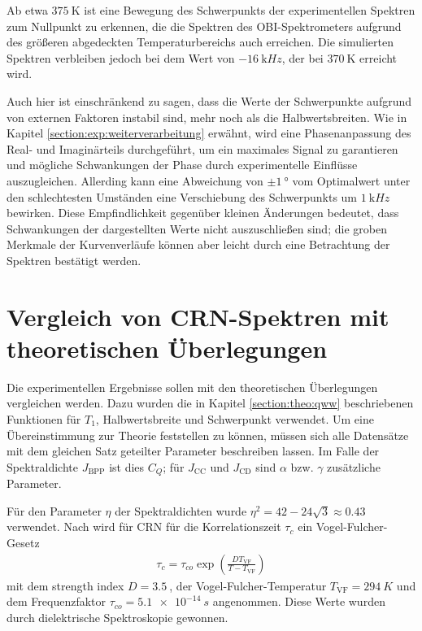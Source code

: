 Ab etwa $\SI{375}{\kelvin}$ ist eine Bewegung des Schwerpunkts der experimentellen Spektren zum Nullpunkt zu erkennen, die die Spektren des OBI-Spektrometers aufgrund des größeren abgedeckten Temperaturbereichs auch erreichen. Die simulierten Spektren verbleiben jedoch bei dem Wert von $\SI{-16}{\kilo Hz}$, der bei $\SI{370}{\kelvin}$ erreicht wird.

Auch hier ist einschränkend zu sagen, dass die Werte der Schwerpunkte aufgrund von externen Faktoren instabil sind, mehr noch als die Halbwertsbreiten. Wie in Kapitel \ref{section:exp:weiterverarbeitung} erwähnt, wird eine Phasenanpassung des Real- und Imaginärteils durchgeführt, um ein maximales Signal zu garantieren und mögliche Schwankungen der Phase durch experimentelle Einflüsse auszugleichen. Allerding kann eine Abweichung von $\pm \SI{1}{\degree}$ vom Optimalwert unter den schlechtesten Umständen eine Verschiebung des Schwerpunkts um $\SI{1}{\kilo Hz}$ bewirken. Diese Empfindlichkeit gegenüber kleinen Änderungen bedeutet, dass Schwankungen der dargestellten Werte nicht auszuschließen sind; die groben Merkmale der Kurvenverläufe können aber leicht durch eine Betrachtung der Spektren bestätigt werden.




\section{Vergleich von CRN-Spektren mit theoretischen Überlegungen} \label{section:res:theorie}

Die experimentellen Ergebnisse sollen mit den theoretischen Überlegungen vergleichen werden. Dazu wurden die in Kapitel \ref{section:theo:qww} beschriebenen Funktionen für $T_1$, Halbwertsbreite und Schwerpunkt verwendet. Um eine Übereinstimmung zur Theorie feststellen zu können, müssen sich alle Datensätze mit dem gleichen Satz geteilter Parameter beschreiben lassen. Im Falle der Spektraldichte $J_\text{BPP}$ ist dies $C_Q$; für $J_\text{CC}$ und $J_\text{CD}$ sind $\alpha$ bzw. $\gamma$ zusätzliche Parameter.

Für den Parameter $\eta$ der Spektraldichten wurde $\eta^2 = 42 - 24 \sqrt{3} \approx \SI{0.43}{}$ \cite{caer} verwendet. Nach \cite{PIMENOV199793} wird für CRN für die Korrelationszeit $\tau_c$ ein Vogel-Fulcher-Gesetz
\begin{align}
	\tau_c = \tau_{co} \exp \left( \frac{D T_\text{VF}}{T-T_\text{VF}} \right)
\end{align}
mit dem strength index $D = \SI{3.5}{}$, der Vogel-Fulcher-Temperatur $T_\text{VF} = \SI{294}{K}$ und dem Frequenzfaktor $\tau_{co} = \SI{5.1e-14}{s}$ angenommen. Diese Werte wurden durch dielektrische Spektroskopie gewonnen.

